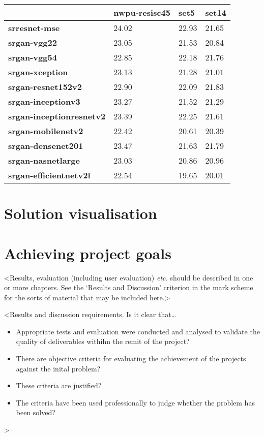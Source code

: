 \begin{table}[h]
    \centering
    \begin{tabular}{llll}
        \toprule
        {} & \textbf{nwpu-resisc45} & \textbf{set5} & \textbf{set14} \\ 
        \midrule
        \textbf{srresnet-mse} & 24.02 & 22.93 & 21.65 \\ 
        \textbf{srgan-vgg22} & 23.05 & 21.53 & 20.84 \\ 
        \textbf{srgan-vgg54} & 22.85 & 22.18 & 21.76 \\ 
        \textbf{srgan-xception} & 23.13 & 21.28 & 21.01 \\ 
        \textbf{srgan-resnet152v2} & 22.90 & 22.09 & 21.83 \\ 
        \textbf{srgan-inceptionv3} & 23.27 & 21.52 & 21.29 \\ 
        \textbf{srgan-inceptionresnetv2} & 23.39 & 22.25 & 21.61 \\ 
        \textbf{srgan-mobilenetv2} & 22.42 & 20.61 & 20.39 \\ 
        \textbf{srgan-densenet201} & 23.47 & 21.63 & 21.79 \\ 
        \textbf{srgan-nasnetlarge} & 23.03 & 20.86 & 20.96 \\ 
        \textbf{srgan-efficientnetv2l} & 22.54 & 19.65 & 20.01 \\
        \bottomrule
    \end{tabular}
\end{table}

\section{Solution visualisation}

\section{Achieving project goals}

<Results, evaluation (including user evaluation) {\em etc.} should be described in one or more chapters. See the `Results and Discussion' criterion in the mark scheme for the sorts of material that may be included here.>

<Results and discussion requirements. Is it clear that\dots
\begin{itemize}
    \item Appropriate tests and evaluation were conducted and analysed to validate the quality of deliverables withihn the remit of the project?
    \item There are objective criteria for evaluating the achievement of the projects against the inital problem?
    \item These criteria are justified?
    \item The criteria have been used professionally to judge whether the problem has been solved?
\end{itemize}
>

